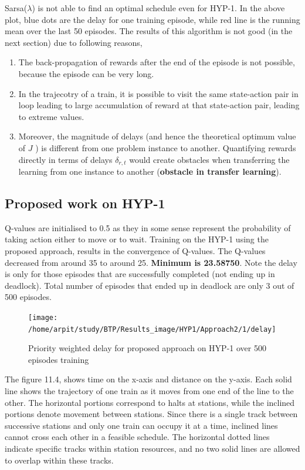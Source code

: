Sarsa($\lambda$) is not able to find an optimal schedule even for HYP-1. In the above plot, 
blue dots are the delay for one training episode, while red line is the running mean over the 
last 50 episodes.
The results of this algorithm is not good (in the next section) due to following reasons,
\begin{enumerate}
\item The back-propagation of rewards
      after the end of the episode is not possible, because the episode
can be very long.
\item In the trajecotry of a train, it is possible to visit the same state-action pair in loop leading to 
large accumulation of reward at that state-action pair, leading to extreme values.
\item Moreover, the magnitude of delays (and hence the theoretical
optimum value of $J$ ) is different from one problem instance
to another. Quantifying rewards directly in terms of delays
$\delta_{r,t}$ would create obstacles when transferring the learning from
one instance to another (\textbf{obstacle in transfer learning}).
\end{enumerate}

\subsection{Proposed work on HYP-1}
Q-values are initialised to 0.5 as they in some sense represent the probability of taking action either 
to move or to wait.
Training on the HYP-1 using the proposed approach, results in the convergence of Q-values. The Q-values 
decreased from around 35 to around 25. \textbf{Minimum is 23.58750}. Note the delay is only for those episodes that 
are successfully completed (not ending up in deadlock). Total number of episodes that ended up in deadlock 
are only 3 out of 500 episodes.

\begin{figure}[H]
    \centering
    \texttt{[image: /home/arpit/study/BTP/Results\_image/HYP1/Approach2/1/delay]}
    \caption{ Priority weighted delay for proposed approach on HYP-1 over 500 episodes training }
    \label{image-myimage20}
\end{figure}

The figure 11.4, shows time on the x-axis and
distance on the y-axis. Each solid line shows the trajectory of 
one train as it moves from one end of the line to the other. The
horizontal portions correspond to halts at stations, while the
inclined portions denote movement between stations. Since
there is a single track between successive stations and only
one train can occupy it at a time, inclined lines cannot cross
each other in a feasible schedule. The horizontal dotted lines
indicate specific tracks within station resources, and no two
solid lines are allowed to overlap within these tracks.

